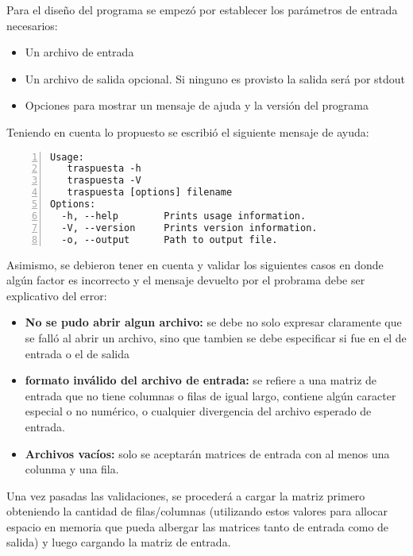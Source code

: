 \documentclass[11pt,a4paper]{article}
\begin{document}
Para el dise\~no del programa se empez\'o por establecer los par\'ametros de entrada necesarios:

\begin{itemize}
\item Un archivo de entrada
\item Un archivo de salida opcional. Si ninguno es provisto la salida ser\'a por stdout
\item Opciones para mostrar un mensaje de ajuda y la versi\'on del programa
\end{itemize}

Teniendo en cuenta lo propuesto se escribi\'o el siguiente mensaje de ayuda:

\begin{lstlisting}[numbers=left, tabsize=2, basicstyle=\fontsize{11}{13}\ttfamily, frame=single, caption={Mensaje de ayuda del programa}]
Usage:
   traspuesta -h
   traspuesta -V
   traspuesta [options] filename
Options:
  -h, --help        Prints usage information.
  -V, --version     Prints version information.
  -o, --output      Path to output file.

\end{lstlisting}

Asimismo, se debieron tener en cuenta y validar los siguientes casos en donde alg\'un factor es incorrecto y el mensaje devuelto por el probrama debe ser explicativo del error:\\

\begin{itemize}
\item \textbf{No se pudo abrir algun archivo:} se debe no solo expresar claramente que se fall\'o al abrir un archivo, sino que tambien se debe especificar si fue en el de entrada o el de salida
\item \textbf{formato inv\'alido del archivo de entrada:} se refiere a una matriz de entrada que no tiene columnas o filas de igual largo, contiene alg\'un caracter especial o no num\'erico, o cualquier divergencia del archivo esperado de entrada.
\item \textbf{Archivos vac\'ios:} solo se aceptar\'an matrices de entrada con al menos una colunma y una fila. 
\end{itemize}

Una vez pasadas las validaciones, se proceder\'a a cargar la matriz primero obteniendo la cantidad de filas/columnas (utilizando estos valores para allocar espacio en memoria que pueda albergar las matrices tanto de entrada como de salida) y luego cargando la matriz de entrada.\\
\end{document}
